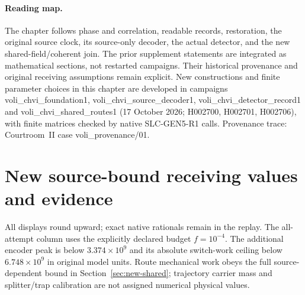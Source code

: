 \providecommand{\dd}{\mathrm d}\providecommand{\ii}{\mathrm i}\providecommand{\Tr}{\operatorname{Tr}}
\providecommand{\norm}[1]{\left\lVert#1\right\rVert}
\providecommand{\Span}{\operatorname{span}}\providecommand{\rank}{\operatorname{rank}}
\providecommand{\sgn}{\operatorname{sgn}}\providecommand{\diag}{\operatorname{diag}}
\providecommand{\Var}{\operatorname{Var}}\providecommand{\Cov}{\operatorname{Cov}}
\setcounter{proposition}{0}
\setcounter{section}{0}\setcounter{equation}{0}\setcounter{figure}{0}\setcounter{table}{0}

\paragraph{Reading map.}
The chapter follows phase and correlation, readable records, restoration,
the original source clock, its source-only decoder, the actual detector,
and the new shared-field/coherent join. The prior supplement statements are
integrated as mathematical sections, not restarted campaigns. Their
historical provenance and original receiving assumptions remain explicit.
New constructions and finite parameter choices in this chapter are developed in campaigns voli\_chvi\_foundation1, voli\_chvi\_source\_decoder1, voli\_chvi\_detector\_record1 and voli\_chvi\_shared\_routes1 (17 October 2026; H002700, H002701, H002706), with finite matrices checked by native SLC-GEN5-R1 calls. Provenance trace: Courtroom~II case voli\_provenance/01.




















\section{New source-bound receiving values and evidence}
\begin{table}[t]\centering\small\end{table}
All displays round upward; exact native rationals remain in the replay.
The all-attempt column uses the explicitly declared budget $f=10^{-4}$.
The additional encoder peak is below $3.374\times10^9$ and its absolute
switch-work ceiling below $6.748\times10^9$ in original model units.
Route mechanical work obeys the full source-dependent bound in
Section~\ref{sec:new-shared}; trajectory carrier mass and splitter/trap
calibration are not assigned numerical physical values.

